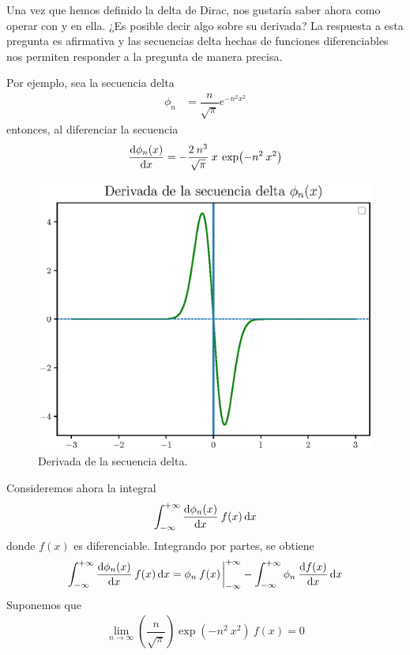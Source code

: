 \documentclass[12pt]{beamer}
\begin{document}
Una vez que hemos definido la delta de Dirac, nos gustaría saber ahora como operar con y en ella. ¿Es posible decir algo sobre su derivada? La respuesta a esta pregunta es afirmativa y las secuencias delta hechas de funciones diferenciables nos permiten responder a la pregunta de manera precisa.
\par
Por ejemplo, sea la secuencia delta
\begin{align*}
\phi_{n} &= \dfrac{n}{\sqrt{\pi}} e^{-n^{2} x^{2}}
\end{align*}
entonces, al diferenciar la secuencia
\begin{align*}
\dv{\phi_{n}(x)}{x} = - \dfrac{2 \: n^{3}}{\sqrt{\pi}} \: x \: \exp(-n^{2} \: x^{2})
\end{align*}
\begin{figure}[H]
    \centering
    \includegraphics[scale=0.8]{Imagenes/secuencia_delta_04.eps}
    \caption{Derivada de la secuencia delta.}
    \label{fig:fig_figura_delta_04}
\end{figure}
Consideremos ahora la integral
\begin{align*}
\int_{-\infty}^{+\infty} \dv{\phi_{n}(x)}{x} \: f(x) \dd{x}
\end{align*}
donde $f(x)$ es diferenciable. Integrando por partes, se obtiene
\begin{align*}
\int_{-\infty}^{+\infty} \dv{\phi_{n}(x)}{x} \: f(x) \dd{x} = \phi_{n} \: f(x) \eval_{-\infty}^{+\infty} - \int_{-\infty}^{+\infty} \phi_{n} \: \dv{f(x)}{x} \dd{x}
\end{align*}
Suponemos que
\begin{align*}
\lim_{n \to \infty} \left( \dfrac{n}{\sqrt{\pi}} \right) \exp(-n^{2} \: x^{2}) \: f(x) = 0
\end{align*}
\end{document}

